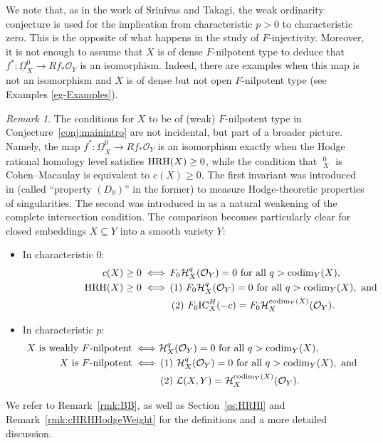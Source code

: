 \documentclass[letterpaper,11pt]{amsart}
\DeclareMathOperator{\DDB}{\underline{\Omega}}
\theoremstyle{plain}
\theoremstyle{definition}
\theoremstyle{remark}
\newtheorem{rmk}[thm]{Remark}
\def\cH{\mathcal{H}}
\def\cL{\mathcal{L}}
\def\cO{\mathcal{O}}
\begin{document}
We note that, as in the work of Srinivas and Takagi, the weak ordinarity conjecture is used for the implication from characteristic $p>0$ to  characteristic zero. This is the opposite of what happens in the study of $F$-injectivity. Moreover, it is not enough to assume that $X$ is of dense $F$-nilpotent type to deduce that $f^* \colon \underline{\Omega}_X^0 \to Rf_*\cO_Y$ is an isomorphism. Indeed, there are examples when this map is not an isomorphism and $X$ is of dense but not open $F$-nilpotent type (see Examples \ref{eg-Examples}). 

 \begin{rmk} \label{rmkInterpretation} The conditions for $X$ to be of (weak) $F$-nilpotent type in Conjecture~\ref{conj:mainintro} are not incidental, but part of a broader picture. Namely, the map $f^* \colon \underline{\Omega}_X^0 \to Rf_*\cO_Y$ is an isomorphism exactly when the Hodge rational homology level satisfies ${\rm HRH}(X) \geq 0$, while the condition that $\DDB^0_X$ is Cohen–Macaulay is equivalent to $c(X) \geq 0$. The first invariant was introduced in \cites{ParkPopa, DOR1} (called ``property $(D_0)$'' in the former) to measure Hodge-theoretic properties of singularities. The second was introduced in \cite{CDOIsolated} as a natural weakening of the complete intersection condition. The comparison becomes particularly clear for closed embeddings $X \subseteq Y$ into a smooth variety $Y$:
\begin{itemize} \item In characteristic $0$: 
\begin{align*}
\hspace{7.9em} c(X) \geq 0 \iff&\, F_0 \cH^q_X(\cO_Y) = 0 \text{ for all } q > {\rm codim}_Y(X),\\
{\rm HRH}(X) \geq 0 \iff&\,   {\footnotesize(1)}\ F_0 \cH^q_X(\cO_Y) = 0 \text{ for all } q > {\rm codim}_Y(X), \text{ and } \\
&\ {\footnotesize(2)}\  F_0 {\rm IC}_X^H(-c) = F_0 \cH^{{\rm codim}_Y(X)}_X(\cO_Y).
\end{align*}
\item In characteristic $p$:
\begin{align*}
X \text{ is weakly }F\text{-nilpotent} \iff& \cH^q_X(\cO_Y) = 0 \text{ for all } q > {\rm codim}_Y(X),\\
X \text{ is }F\text{-nilpotent} \iff&\,   {\footnotesize(1)}\  \cH^q_X(\cO_Y) = 0 \text{ for all } q > {\rm codim}_Y(X), \text{ and } \\
&\,  {\footnotesize(2)}\ \cL(X,Y) = \cH^{{\rm codim}_Y(X)}_X(\cO_Y).
\end{align*}
\end{itemize}
\noindent We refer to  Remark~\ref{rmk:BB}, as well as Section~\ref{ss:HRHl} and Remark~\ref{rmk:cHRHHodgeWeight} for the definitions and a more detailed discussion. 


\end{rmk}
\end{document}

